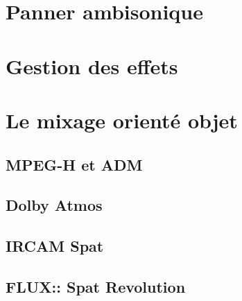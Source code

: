 \documentclass[
  letterpaper,
  DIV=11,
  numbers=noendperiod]{scrreprt}
\begin{document}
\hypertarget{panner-ambisonique}{%
\chapter{Panner ambisonique}\label{panner-ambisonique}}

\hypertarget{gestion-des-effets}{%
\chapter{Gestion des effets}\label{gestion-des-effets}}

\hypertarget{sec-mix-obj}{%
\chapter{Le mixage orienté objet}\label{sec-mix-obj}}

\hypertarget{mpeg-h-et-adm}{%
\section{MPEG-H et ADM}\label{mpeg-h-et-adm}}

\hypertarget{dolby-atmos}{%
\section{Dolby Atmos}\label{dolby-atmos}}

\hypertarget{ircam-spat}{%
\section{IRCAM Spat}\label{ircam-spat}}

\hypertarget{flux-spat-revolution}{%
\section{FLUX:: Spat Revolution}\label{flux-spat-revolution}}
\end{document}
